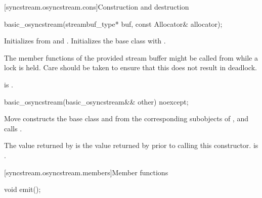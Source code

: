 [syncstream.osyncstream.cons]{Construction and destruction}

%
\begin{itemdecl}
basic_osyncstream(streambuf_type* buf, const Allocator& allocator);
\end{itemdecl}

\begin{itemdescr}
\pnum
\effects
Initializes  from  and .
Initializes the base class with .

\pnum
\begin{note}
The member functions of the provided stream buffer
might be called from  while a lock is held.
Care should be taken to ensure that this does not result in deadlock.
\end{note}

\pnum
\ensures
{} is .
\end{itemdescr}

%
\begin{itemdecl}
basic_osyncstream(basic_osyncstream&& other) noexcept;
\end{itemdecl}

\begin{itemdescr}
\pnum
\effects
Move constructs the base class
and  from the corresponding subobjects of ,
and calls .

\pnum
\ensures
The value returned by 
is the value returned by 
prior to calling this constructor.
 is .
\end{itemdescr}

[syncstream.osyncstream.members]{Member functions}

%
\begin{itemdecl}
void emit();
\end{itemdecl}

